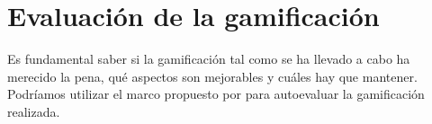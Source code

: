 \section{Evaluación de la gamificación}

Es fundamental saber si la gamificación tal como se ha llevado a cabo ha merecido la pena, qué aspectos son mejorables y cuáles hay que mantener.
%
Podríamos utilizar el marco propuesto por \cite{EvaluacionGamificacion} para autoevaluar la gamificación realizada.
